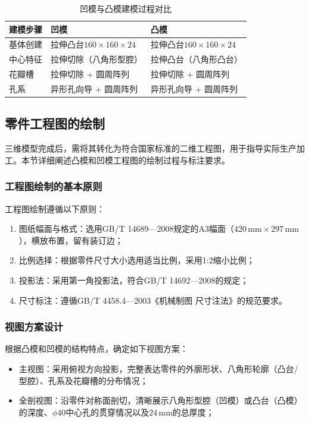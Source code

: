 \documentclass{xautCADreport}
\begin{document}
\begin{table}[H]
  \centering
  \caption{凹模与凸模建模过程对比}
  \label{tab:modeling_compare}
  \begin{tabular}{lll}
    \toprule
    建模步骤 & 凹模 & 凸模 \\
    \midrule
    基体创建 & 拉伸凸台$160\times160\times24$ & 拉伸凸台$160\times160\times24$ \\
    中心特征 & 拉伸切除（八角形型腔） & 拉伸凸台（八角形凸台） \\
    花瓣槽 & 拉伸切除 + 圆周阵列 & 拉伸切除 + 圆周阵列 \\
    孔系 & 异形孔向导 + 圆周阵列 & 异形孔向导 + 圆周阵列 \\
    \bottomrule
  \end{tabular}
\end{table}

\subsection{零件工程图的绘制}

三维模型完成后，需将其转化为符合国家标准的二维工程图，用于指导实际生产加工。本节详细阐述凸模和凹模工程图的绘制过程与标注要求。

\subsubsection{工程图绘制的基本原则}

工程图绘制遵循以下原则：
\begin{enumerate}
  \item 图纸幅面与格式：选用GB/T 14689—2008规定的A3幅面（$420\,\mathrm{mm}\times297\,\mathrm{mm}$），横放布置，留有装订边；
  \item 比例选择：根据零件尺寸大小选用适当比例，采用1:2缩小比例；
  \item 投影法：采用第一角投影法，符合GB/T 14692—2008的规定；
  \item 尺寸标注：遵循GB/T 4458.4—2003《机械制图 尺寸注法》的规范要求。
\end{enumerate}

\subsubsection{视图方案设计}

根据凸模和凹模的结构特点，确定如下视图方案：

\begin{itemize}
  \item 主视图：采用俯视方向投影，完整表达零件的外廓形状、八角形轮廓（凸台/型腔）、孔系及花瓣槽的分布情况；
  \item 全剖视图：沿零件对称面剖切，清晰展示八角形型腔（凹模）或凸台（凸模）的深度、$\phi40$中心孔的贯穿情况以及$24\,\mathrm{mm}$的总厚度；
\end{itemize}
\end{document}
